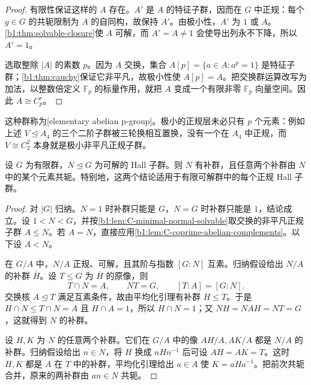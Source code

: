 \begin{proof}
	有限性保证这样的 \(A\) 存在。\(A'\) 是 \(A\) 的特征子群，因而在 \(G\) 中正规：每个 \(g\in G\) 的共轭限制为 \(A\) 的自同构，故保持 \(A'\)。由极小性，\(A'\) 为 \(1\) 或 \(A\)。\cref{b1:thm:solvable-closure}使 \(A\) 可解，而 \(A'=A\ne1\) 会使导出列永不下降，所以 \(A'=1\)。

	选取整除 \(|A|\) 的素数 \(p\)。因为 \(A\) 交换，集合 \(A[p]=\{a\in A:a^p=1\}\) 是特征子群；\cref{b1:thm:cauchy}保证它非平凡，故极小性使 \(A[p]=A\)。把交换群运算改写为加法，以整数倍定义 \(\mathbb F_p\) 的标量作用，就把 \(A\) 变成一个有限非零 \(\mathbb F_p\) 向量空间。因此 \(A\cong C_p^r\)。
\end{proof}

这种群称为[elementary abelian p-group]。极小的正规层未必只有 \(p\) 个元素：例如上述 \(V\trianglelefteq A_4\) 的三个二阶子群被三轮换相互置换，没有一个在 \(A_4\) 中正规，而 \(V\cong C_2^2\) 本身就是极小非平凡正规子群。

\begin{theorem}\label{b1:thm:C-schur-zassenhaus-solvable-kernel}
	设 \(G\) 为有限群，\(N\trianglelefteq G\) 为可解的 Hall 子群。则 \(N\) 有补群，且任意两个补群由 \(N\) 中的某个元素共轭。特别地，这两个结论适用于有限可解群中的每个正规 Hall 子群。
\end{theorem}

\begin{proof}
	对 \(|G|\) 归纳。\(N=1\) 时补群只能是 \(G\)，\(N=G\) 时补群只能是 \(1\)，结论成立。设 \(1<N<G\)，并按\cref{b1:lem:C-minimal-normal-solvable}取交换的非平凡正规子群 \(A\leq N\)。若 \(A=N\)，直接应用\cref{b1:lem:C-coprime-abelian-complements}。以下设 \(A<N\)。

	在 \(G/A\) 中，\(N/A\) 正规、可解，且其阶与指数 \([G:N]\) 互素。归纳假设给出 \(N/A\) 的补群 \(\overline H\)。设 \(T\leq G\) 为 \(\overline H\) 的原像，则
	\[
		T\cap N=A,\qquad NT=G,\qquad [T:A]=[G:N].
	\]
	交换核 \(A\trianglelefteq T\) 满足互素条件，故由平均化引理有补群 \(H\leq T\)。于是 \(H\cap N\leq T\cap N=A\) 且 \(H\cap A=1\)，所以 \(H\cap N=1\)；又 \(NH=NAH=NT=G\)，这就得到 \(N\) 的补群。

	设 \(H,K\) 为 \(N\) 的任意两个补群。它们在 \(G/A\) 中的像 \(AH/A,AK/A\) 都是 \(N/A\) 的补群。归纳假设给出 \(n\in N\)，将 \(H\) 换成 \(nHn^{-1}\) 后可设 \(AH=AK=T\)。这时 \(H,K\) 都是 \(A\) 在 \(T\) 中的补群，平均化引理给出 \(a\in A\) 使 \(K=aHa^{-1}\)。把前次共轭合并，原来的两补群由 \(an\in N\) 共轭。
\end{proof}

